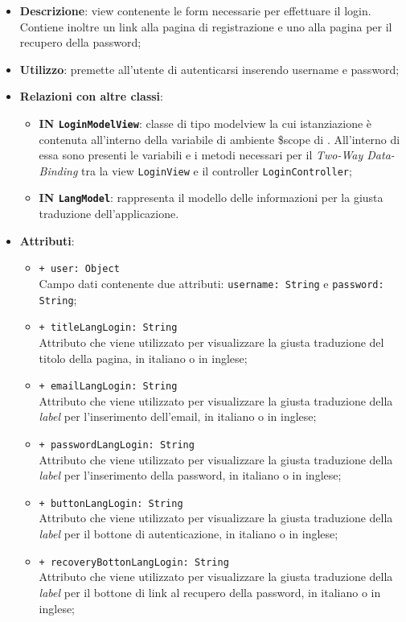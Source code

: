\begin{itemize}
	\item \textbf{Descrizione}: view contenente le form necessarie per effettuare il login. Contiene inoltre un link alla pagina di registrazione e uno alla pagina per il recupero della password;
	\item \textbf{Utilizzo}: premette all'utente di autenticarsi inserendo username e password;
	\item \textbf{Relazioni con altre classi}:
	\begin{itemize}
		\item \textbf{IN \texttt{LoginModelView}}: classe di tipo modelview la cui istanziazione è contenuta all'interno della variabile di ambiente \$scope di . All'interno di essa sono presenti le variabili e i metodi necessari per il \textit{Two-Way Data-Binding} tra la view \texttt{LoginView} e il controller \texttt{LoginController};
		\item \textbf{IN \texttt{LangModel}}: rappresenta il modello delle informazioni per la giusta traduzione dell'applicazione.
	\end{itemize}
	\item \textbf{Attributi}:
	\begin{itemize}
		\item \texttt{+ user: Object} \\ Campo dati contenente due attributi: \texttt{username: String} e \texttt{password: String};
		\item \texttt{+ titleLangLogin: String} \\ Attributo che viene utilizzato per visualizzare la giusta traduzione del titolo della pagina, in italiano o in inglese;
		\item \texttt{+ emailLangLogin: String} \\ Attributo che viene utilizzato per visualizzare la giusta traduzione della \textit{label} per l'inserimento dell'email, in italiano o in inglese;
		\item \texttt{+ passwordLangLogin: String} \\ Attributo che viene utilizzato per visualizzare la giusta traduzione della \textit{label} per l'inserimento della password, in italiano o in inglese;  
		\item \texttt{+ buttonLangLogin: String} \\ Attributo che viene utilizzato per visualizzare la giusta traduzione della \textit{label} per il bottone di autenticazione, in italiano o in inglese;
		\item \texttt{+ recoveryBottonLangLogin: String} \\ Attributo che viene utilizzato per visualizzare la giusta traduzione della \textit{label} per il bottone di link al recupero della password, in italiano o in inglese;

\end{itemize}
\end{itemize}
